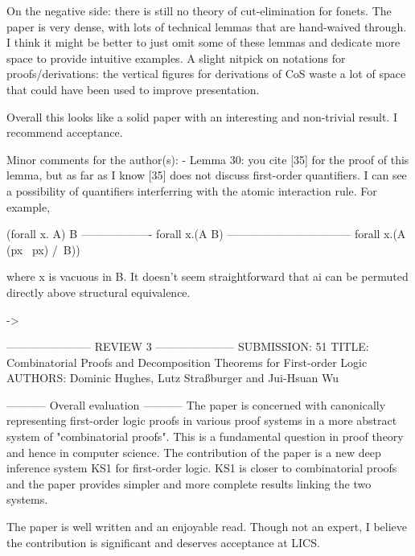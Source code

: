 On the negative side: there is still no theory of cut-elimination for fonets.
The paper is very dense, with lots of technical lemmas that are hand-waived through. I think it might be better to just omit some of these lemmas and dedicate more space to provide intuitive examples. A slight nitpick on notations for proofs/derivations: the vertical figures for derivations of CoS waste a lot of space that could have been used to improve presentation.

Overall this looks like a solid paper with an interesting and non-trivial result. I recommend acceptance.

Minor comments for the author(s):
- Lemma 30: you cite [35] for the proof of this lemma, but as far as I know [35] does not discuss first-order quantifiers. I can see a possibility of quantifiers interferring with the atomic interaction rule. For example,

(forall x. A) \/ B
-------------------
forall x.(A \/ B)
---------------------------------
forall x.(A \/ (px \/ ~px) /\ B))

where x is vacuous in B. It doesn't seem straightforward that ai can be permuted directly above structural equivalence.

-> 

----------------------- REVIEW 3 ---------------------
SUBMISSION: 51
TITLE: Combinatorial Proofs and Decomposition Theorems for First-order Logic
AUTHORS: Dominic Hughes, Lutz Straßburger and Jui-Hsuan Wu

----------- Overall evaluation -----------
The paper is concerned with canonically representing first-order logic proofs in various proof systems in a more abstract system of "combinatorial proofs". This is a fundamental question in proof theory and hence in computer science. The contribution of the paper is a new deep inference system KS1  for first-order logic. KS1 is closer to combinatorial proofs and the paper provides simpler and more complete results linking the two systems.

  The paper is well written and an enjoyable read. Though not an expert, I believe the contribution is significant and deserves acceptance at LICS.
